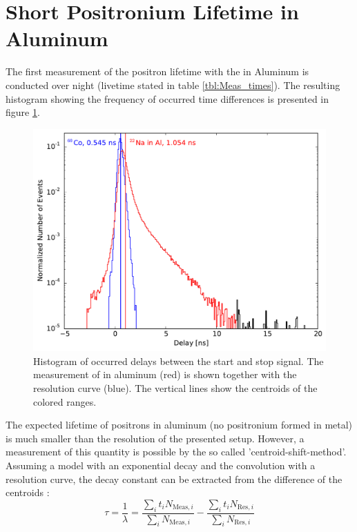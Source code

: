 \documentclass[
	paper=A4,
	parskip=full,
	chapterprefix=true,
	11pt,
	headings=normal,
	bibliography=totoc,
	listof=totoc,
	titlepage=on,
]{scrreprt}
\begin{document}
\section{Short Positronium Lifetime in Aluminum}

The first measurement of the positron lifetime with the  in Aluminum is conducted over night (livetime stated in table \ref{tbl:Meas_times}). The resulting histogram showing the frequency of occurred time differences is presented in figure \ref{fig:Na22_alu}. 

\begin{figure}
	\centering
	\includegraphics{na22_aluminum}
	\caption{Histogram of occurred delays between the start and stop signal. The measurement of  in aluminum (red) is shown together with the resolution curve (blue). The vertical lines show the centroids of the colored ranges.}
	\label{fig:Na22_alu}
\end{figure}

The expected lifetime of positrons in aluminum (no positronium formed in metal) is much smaller than the resolution of the presented setup. However, a measurement of this quantity is possible by the so called 'centroid-shift-method'. Assuming a model with an exponential decay and the convolution with a resolution curve, the decay constant can be extracted from the difference of the centroids \cite{Lab_manual_T8}:
\begin{equation}
	\tau = \frac{1}{\lambda} = \frac{\sum_i t_i N_{\textrm{Meas},i}}{\sum_i N_{\textrm{Meas},i}} - \frac{\sum_i t_i N_{\textrm{Res},i}}{\sum_i N_{\textrm{Res},i}} 
\label{eq:centroid}
\end{equation}
\end{document}
